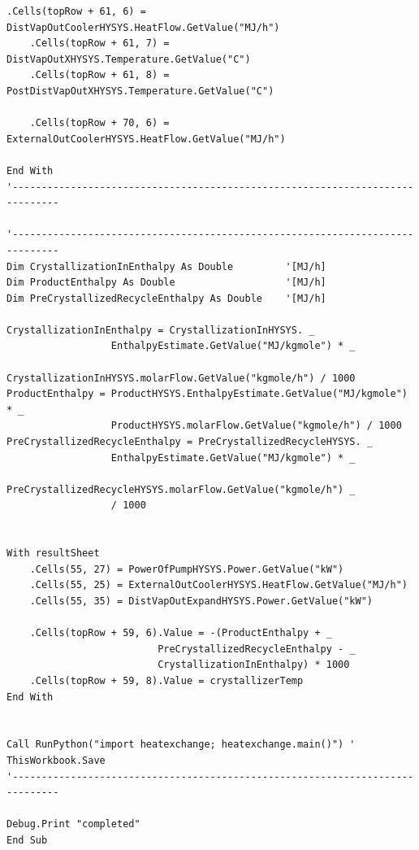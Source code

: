 \documentclass[a4j]{jsreport}
\begin{document}
\begin{lstlisting}[caption=HYSYSとpythonを繋ぐコード]
    .Cells(topRow + 61, 6) = DistVapOutCoolerHYSYS.HeatFlow.GetValue("MJ/h")
    .Cells(topRow + 61, 7) = DistVapOutXHYSYS.Temperature.GetValue("C")
    .Cells(topRow + 61, 8) = PostDistVapOutXHYSYS.Temperature.GetValue("C")

    .Cells(topRow + 70, 6) = ExternalOutCoolerHYSYS.HeatFlow.GetValue("MJ/h")

End With
'------------------------------------------------------------------------------

'------------------------------------------------------------------------------
Dim CrystallizationInEnthalpy As Double         '[MJ/h]
Dim ProductEnthalpy As Double                   '[MJ/h]
Dim PreCrystallizedRecycleEnthalpy As Double    '[MJ/h]

CrystallizationInEnthalpy = CrystallizationInHYSYS. _
                  EnthalpyEstimate.GetValue("MJ/kgmole") * _
                  CrystallizationInHYSYS.molarFlow.GetValue("kgmole/h") / 1000
ProductEnthalpy = ProductHYSYS.EnthalpyEstimate.GetValue("MJ/kgmole") * _
                  ProductHYSYS.molarFlow.GetValue("kgmole/h") / 1000
PreCrystallizedRecycleEnthalpy = PreCrystallizedRecycleHYSYS. _
                  EnthalpyEstimate.GetValue("MJ/kgmole") * _
                  PreCrystallizedRecycleHYSYS.molarFlow.GetValue("kgmole/h") _
                  / 1000


With resultSheet
    .Cells(55, 27) = PowerOfPumpHYSYS.Power.GetValue("kW")
    .Cells(55, 25) = ExternalOutCoolerHYSYS.HeatFlow.GetValue("MJ/h")
    .Cells(55, 35) = DistVapOutExpandHYSYS.Power.GetValue("kW")

    .Cells(topRow + 59, 6).Value = -(ProductEnthalpy + _
                          PreCrystallizedRecycleEnthalpy - _
                          CrystallizationInEnthalpy) * 1000
    .Cells(topRow + 59, 8).Value = crystallizerTemp
End With


Call RunPython("import heatexchange; heatexchange.main()") '
ThisWorkbook.Save
'------------------------------------------------------------------------------

Debug.Print "completed"
End Sub
\end{lstlisting}
\end{document}

